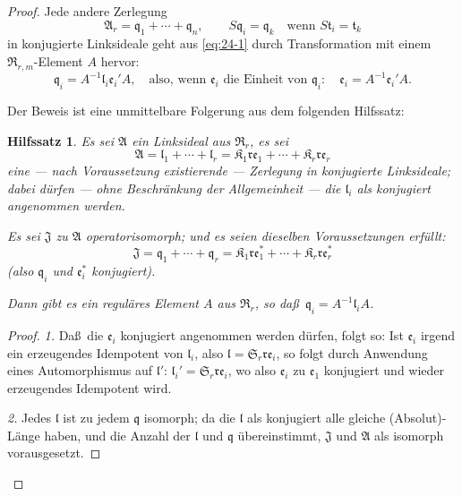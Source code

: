 \documentclass[12pt,a4paper]{article}
\theoremstyle{plain}
\newtheorem{hilfssatz}{Hilfssatz}[section]
\theoremstyle{definition}
\theoremstyle{remark}
\begin{document}
\begin{proof}
Jede andere Zerlegung
\begin{equation}\label{eq:24-2}
\mathfrak{A}_{r} = \mathfrak{q}_{1} + \cdots + \mathfrak{q}_{n}, \qquad
S\mathfrak{q}_{i} = \mathfrak{q}_{k} \quad \text{wenn } S\mathfrak{t}_{i} = \mathfrak{t}_{k}
\end{equation}
in konjugierte Linksideale geht aus \eqref{eq:24-1} durch Transformation mit einem
$\mathfrak{R}_{r,m}$-Element $A$ hervor:
\[
\mathfrak{q}_{i} = A^{-1}\mathfrak{l}_{i}\mathfrak{e}_{i}'A, \quad \text{also, wenn } \mathfrak{e}_{i} \text{ die Einheit von } \mathfrak{q}_{i}:\quad
\mathfrak{e}_{i} = A^{-1}\mathfrak{e}_{i}'A.
\]

Der Beweis ist eine unmittelbare Folgerung aus dem folgenden Hilfssatz:

\begin{hilfssatz}\label{hilf:24-1}
Es sei $\mathfrak{A}$ ein Linksideal aus $\mathfrak{R}_{r}$, es sei
\[
\mathfrak{A} = \mathfrak{l}_{1} + \cdots + \mathfrak{l}_{r} = \mathfrak{K}_{1}\mathfrak{r}\mathfrak{e}_{1} + \cdots + \mathfrak{K}_{r}\mathfrak{r}\mathfrak{e}_{r}
\]
eine --- nach Voraussetzung existierende --- Zerlegung in konjugierte
Linksideale; dabei d\"urfen --- ohne Beschr\"ankung der Allgemeinheit --- die
$\mathfrak{l}_{i}$ als konjugiert angenommen werden.

Es sei $\mathfrak{J}$ zu $\mathfrak{A}$ operatorisomorph; und es seien dieselben Voraussetzungen
erf\"ullt:
\[
\mathfrak{J} = \mathfrak{q}_{1} + \cdots + \mathfrak{q}_{r} = \mathfrak{K}_{1}\mathfrak{r}\mathfrak{e}_{1}^{*} + \cdots + \mathfrak{K}_{r}\mathfrak{r}\mathfrak{e}_{r}^{*}
\]
(also $\mathfrak{q}_{i}$ und $\mathfrak{e}_{i}^{*}$ konjugiert).

Dann gibt es ein regul\"ares Element $A$ aus $\mathfrak{R}_{r}$, so da\ss\ $\mathfrak{q}_{i} = A^{-1}\mathfrak{l}_{i}A$.
\end{hilfssatz}

\begin{proof}
\textit{1.} Da\ss\ die $\mathfrak{e}_{i}$ konjugiert angenommen werden d\"urfen, folgt so:
Ist $\mathfrak{e}_{i}$ irgend ein erzeugendes Idempotent von $\mathfrak{l}_{i}$, also
$\mathfrak{l} = \mathfrak{S}_{r}\mathfrak{r}\mathfrak{e}_{i}$, so folgt durch Anwendung eines Automorphismus auf
$\mathfrak{l}'$: $\mathfrak{l}_{i}' = \mathfrak{S}_{r}\mathfrak{r}\mathfrak{e}_{i}$, wo also $\mathfrak{e}_{i}$ zu $\mathfrak{e}_{1}$ konjugiert und wieder
erzeugendes Idempotent wird.

\textit{2.} Jedes $\mathfrak{l}$ ist zu jedem $\mathfrak{q}$ isomorph; da die $\mathfrak{l}$ als konjugiert alle
gleiche (Absolut)-L\"ange haben, und die Anzahl der $\mathfrak{l}$ und $\mathfrak{q}$ \"ubereinstimmt,
$\mathfrak{J}$ und $\mathfrak{A}$ als isomorph vorausgesetzt.


\end{proof}
\end{proof}
\end{document}
